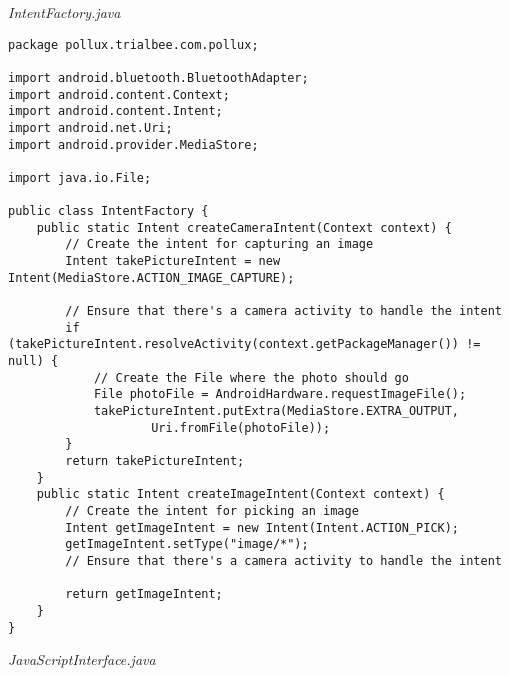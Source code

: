\emph{IntentFactory.java}
\begin{lstlisting}
package pollux.trialbee.com.pollux;

import android.bluetooth.BluetoothAdapter;
import android.content.Context;
import android.content.Intent;
import android.net.Uri;
import android.provider.MediaStore;

import java.io.File;

public class IntentFactory {
    public static Intent createCameraIntent(Context context) {
        // Create the intent for capturing an image
        Intent takePictureIntent = new Intent(MediaStore.ACTION_IMAGE_CAPTURE);

        // Ensure that there's a camera activity to handle the intent
        if (takePictureIntent.resolveActivity(context.getPackageManager()) != null) {
            // Create the File where the photo should go
            File photoFile = AndroidHardware.requestImageFile();
            takePictureIntent.putExtra(MediaStore.EXTRA_OUTPUT,
                    Uri.fromFile(photoFile));
        }
        return takePictureIntent;
    }
    public static Intent createImageIntent(Context context) {
        // Create the intent for picking an image
        Intent getImageIntent = new Intent(Intent.ACTION_PICK);
        getImageIntent.setType("image/*");
        // Ensure that there's a camera activity to handle the intent

        return getImageIntent;
    }
}
\end{lstlisting}
\emph{JavaScriptInterface.java}
